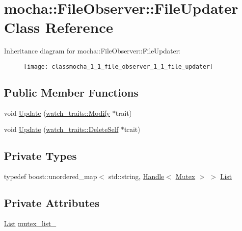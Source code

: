 \hypertarget{classmocha_1_1_file_observer_1_1_file_updater}{
\section{mocha::FileObserver::FileUpdater Class Reference}
\label{classmocha_1_1_file_observer_1_1_file_updater}
}
Inheritance diagram for mocha::FileObserver::FileUpdater:\begin{figure}[H]
\begin{center}
\leavevmode
\texttt{[image: classmocha\_1\_1\_file\_observer\_1\_1\_file\_updater]}
\end{center}
\end{figure}
\subsection*{Public Member Functions}
\begin{DoxyCompactItemize}
\item 
void \hyperlink{classmocha_1_1_file_observer_1_1_file_updater_a80a60cca8240f014e4f191bb60d82bf3}{Update} (\hyperlink{structmocha_1_1watch__traits_1_1_modify}{watch\_\-traits::Modify} $\ast$trait)
\item 
void \hyperlink{classmocha_1_1_file_observer_1_1_file_updater_a1984b103811915719d04d979275d6beb}{Update} (\hyperlink{structmocha_1_1watch__traits_1_1_delete_self}{watch\_\-traits::DeleteSelf} $\ast$trait)
\end{DoxyCompactItemize}
\subsection*{Private Types}
\begin{DoxyCompactItemize}
\item 
typedef boost::unordered\_\-map$<$ std::string, \hyperlink{classmocha_1_1_handle}{Handle}$<$ \hyperlink{classmocha_1_1_mutex}{Mutex} $>$ $>$ \hyperlink{classmocha_1_1_file_observer_1_1_file_updater_a63074c527b9a0bcb0f8a715b53535c17}{List}
\end{DoxyCompactItemize}
\subsection*{Private Attributes}
\begin{DoxyCompactItemize}
\item 
\hyperlink{classmocha_1_1_file_observer_1_1_file_updater_a63074c527b9a0bcb0f8a715b53535c17}{List} \hyperlink{classmocha_1_1_file_observer_1_1_file_updater_a12e24a3b76615c93d5fc14a3eea7354d}{mutex\_\-list\_\-}
\end{DoxyCompactItemize}
